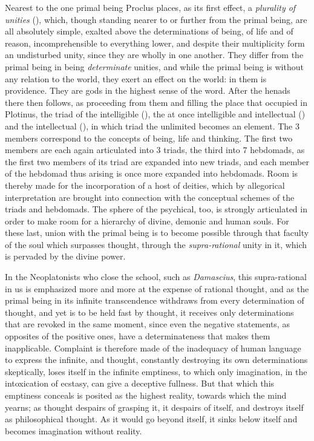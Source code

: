 Nearest to the one primal being Proclus places, as its first effect, a
\emph{plurality of unities} (), which, though standing nearer
to or further from the primal being, are all absolutely simple, exalted
above the determinations of being, of life and of reason,
incomprehensible to everything lower, and despite their multiplicity
form an undisturbed unity, since they are wholly in one another. They
differ from the primal being in being \emph{determinate} unities, and
while the primal being is without any relation to the world, they exert
an effect on the world: in them is providence. They are gods in the
highest sense of the word. After the henads there then follows, as
proceeding from them and filling the place that  occupied in
Plotinus, the triad of the intelligible (), the at once
intelligible and intellectual () and the intellectual (), in which triad the
unlimited becomes an element. The 3 members correspond to the
concepts of being, life and thinking. The first two members are each
again articulated into 3 triads, the third into 7 hebdomads, as the
first two members of its triad are expanded into new triads, and each
member of the hebdomad thus arising is once more expanded into
hebdomads. Room is thereby made for the incorporation of a host of
deities, which by allegorical interpretation are brought into
connection with the conceptual schemes of the triads and hebdomads. The
sphere of the psychical, too, is strongly articulated in order to make
room for a hierarchy of divine, demonic and human souls. For these last,
union with the primal being is to become possible through that faculty
of the soul which surpasses thought, through the \emph{supra-rational}
unity in it, which is pervaded by the divine power.

In the Neoplatonists who close the school, such as \emph{Damascius},
this supra-rational in us is emphasized more and more at the expense of
rational thought, and as the primal being in its infinite transcendence
withdraws from every determination of thought, and yet is to be held
fast by thought, it receives only determinations that are revoked in the
same moment, since even the negative statements, as opposites of the
positive ones, have a determinateness that makes them inapplicable.
Complaint is therefore made of the inadequacy of human language to
express the infinite, and thought, constantly destroying its own
determinations skeptically, loses itself in the infinite emptiness, to
which only imagination, in the intoxication of ecstasy, can give a
deceptive fullness. But that which this emptiness conceals is posited
as the highest reality, towards which the mind yearns; as thought
despairs of grasping it, it despairs of itself, and destroys itself as
philosophical thought. As it would go beyond itself, it sinks below
itself and becomes imagination without reality.

